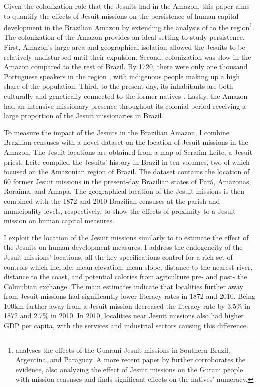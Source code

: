 \documentclass{article}
\begin{document}
Given the colonization role that the Jesuits had in the Amazon, this paper aims to quantify the effects of Jesuit missions on the persistence of human capital development in the Brazilian Amazon by extending the analysis of \textcite{Valencia_Caicedo2018-gp} to the region\footnote{
  \textcite{Valencia_Caicedo2018-gp} analyses the effects of the Guarani Jesuit missions in Southern Brazil, Argentina, and Paraguay. A more recent paper by \textcite{Gomez-i-Aznar2022-pt} further corroborates the evidence, also analyzing the effect of Jesuit missions on the Gurani people with mission censuses and finds significant effects on the natives' numeracy.}. 
The colonization of the Amazon provides an ideal setting to study persistence. 
First, Amazon's large area and geographical isolation allowed the Jesuits to be relatively undisturbed until their expulsion. 
Second, colonization was slow in the Amazon compared to the rest of Brazil. 
By 1720, there were only one thousand Portuguese speakers in the region \parencite{Mufwene2014-gx}, with indigenous people making up a high share of the population. 
Third, to the present day, its inhabitants are both culturally and genetically connected to the former natives \parencites[p.~50]{Arenz2012-cc}{Parker1989-ul}{Souza2019-lr}. 
Lastly, the Amazon had an intensive missionary presence throughout its colonial period receiving a large proportion of the Jesuit missionaries in Brazil. 

To measure the impact of the Jesuits in the Brazilian Amazon, I combine Brazilian censuses with a novel dataset on the location of Jesuit missions in the Amazon.
The Jesuit locations are obtained from a map of Serafim Leite, a Jesuit priest.
Leite compiled the Jesuits' history in Brazil in ten volumes, two of which focused on the Amazonian region of Brazil.
The dataset contains the location of 60 former Jesuit missions in the present-day Brazilian states of Pará, Amazonas, Roraima, and Amapa. 
The geographical location of the Jesuit missions is then combined with the 1872 and 2010 Brazilian censuses at the parish and municipality levels, respectively, to show the effects of proximity to a Jesuit mission on human capital measures.

I exploit the location of the Jesuit missions similarly to \textcite{Valencia_Caicedo2018-gp} to estimate the effect of the Jesuits on human development measures. 
I address the endogeneity of the Jesuit missions' locations, all the key specifications control for a rich set of controls which include: mean elevation, mean slope, distance to the nearest river, distance to the coast, and potential calories from agriculture pre- and post- the Columbian exchange. 
The main estimates indicate that localities further away from Jesuit missions had significantly lower literacy rates in 1872 and 2010. Being 100km farther away from a Jesuit mission decreased the literacy rate by 3.5\% in 1872 and 2.7\% in 2010. 
In 2010, localities near Jesuit missions also had higher GDP per capita, with the services and industrial sectors causing this difference. 
\end{document}
